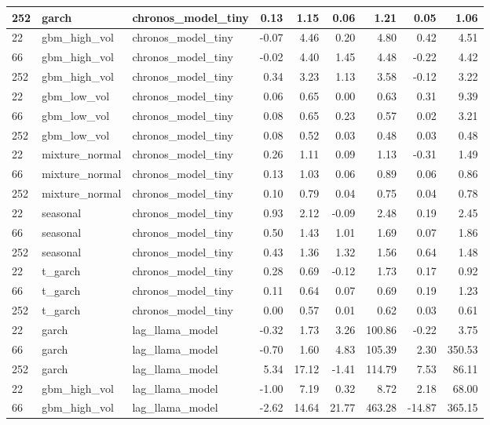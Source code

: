 {\begin{tabular}{lllrrrrrr}
252 & garch & chronos\_model\_tiny & 0.13 & 1.15 & 0.06 & 1.21 & 0.05 & 1.06 \\
\midrule
22 & gbm\_high\_vol & chronos\_model\_tiny & -0.07 & 4.46 & 0.20 & 4.80 & 0.42 & 4.51 \\
66 & gbm\_high\_vol & chronos\_model\_tiny & -0.02 & 4.40 & 1.45 & 4.48 & -0.22 & 4.42 \\
252 & gbm\_high\_vol & chronos\_model\_tiny & 0.34 & 3.23 & 1.13 & 3.58 & -0.12 & 3.22 \\
\midrule
22 & gbm\_low\_vol & chronos\_model\_tiny & 0.06 & 0.65 & 0.00 & 0.63 & 0.31 & 9.39 \\
66 & gbm\_low\_vol & chronos\_model\_tiny & 0.08 & 0.65 & 0.23 & 0.57 & 0.02 & 3.21 \\
252 & gbm\_low\_vol & chronos\_model\_tiny & 0.08 & 0.52 & 0.03 & 0.48 & 0.03 & 0.48 \\
\midrule
22 & mixture\_normal & chronos\_model\_tiny & 0.26 & 1.11 & 0.09 & 1.13 & -0.31 & 1.49 \\
66 & mixture\_normal & chronos\_model\_tiny & 0.13 & 1.03 & 0.06 & 0.89 & 0.06 & 0.86 \\
252 & mixture\_normal & chronos\_model\_tiny & 0.10 & 0.79 & 0.04 & 0.75 & 0.04 & 0.78 \\
\midrule
22 & seasonal & chronos\_model\_tiny & 0.93 & 2.12 & -0.09 & 2.48 & 0.19 & 2.45 \\
66 & seasonal & chronos\_model\_tiny & 0.50 & 1.43 & 1.01 & 1.69 & 0.07 & 1.86 \\
252 & seasonal & chronos\_model\_tiny & 0.43 & 1.36 & 1.32 & 1.56 & 0.64 & 1.48 \\
\midrule
22 & t\_garch & chronos\_model\_tiny & 0.28 & 0.69 & -0.12 & 1.73 & 0.17 & 0.92 \\
66 & t\_garch & chronos\_model\_tiny & 0.11 & 0.64 & 0.07 & 0.69 & 0.19 & 1.23 \\
252 & t\_garch & chronos\_model\_tiny & 0.00 & 0.57 & 0.01 & 0.62 & 0.03 & 0.61 \\
\midrule
22 & garch & lag\_llama\_model & -0.32 & 1.73 & 3.26 & 100.86 & -0.22 & 3.75 \\
66 & garch & lag\_llama\_model & -0.70 & 1.60 & 4.83 & 105.39 & 2.30 & 350.53 \\
252 & garch & lag\_llama\_model & 5.34 & 17.12 & -1.41 & 114.79 & 7.53 & 86.11 \\
\midrule
22 & gbm\_high\_vol & lag\_llama\_model & -1.00 & 7.19 & 0.32 & 8.72 & 2.18 & 68.00 \\
66 & gbm\_high\_vol & lag\_llama\_model & -2.62 & 14.64 & 21.77 & 463.28 & -14.87 & 365.15 \\

\end{tabular}}
